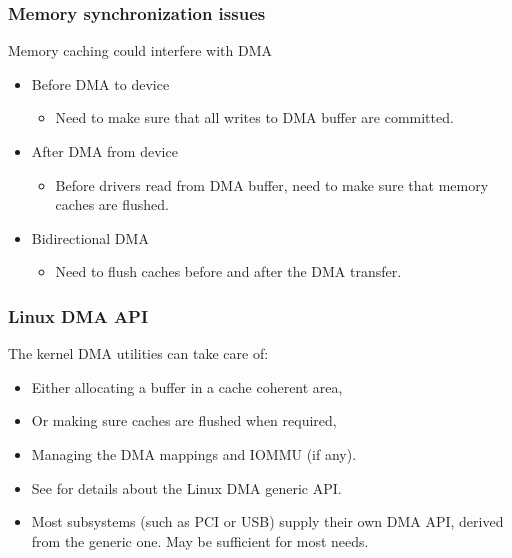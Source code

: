 \begin{frame}
  \frametitle{Memory synchronization issues}
  Memory caching could interfere with DMA
  \begin{itemize}
  \item Before DMA to device
    \begin{itemize}
    \item Need to make sure that all writes to DMA buffer are
      committed.
    \end{itemize}
  \item After DMA from device
    \begin{itemize}
    \item Before drivers read from DMA buffer, need to make sure
      that memory caches are flushed.
    \end{itemize}
  \item Bidirectional DMA
    \begin{itemize}
    \item Need to flush caches before and after the DMA transfer.
    \end{itemize}
  \end{itemize}
\end{frame}

\begin{frame}
  \frametitle{Linux DMA API}
  The kernel DMA utilities can take care of:
  \begin{itemize}
  \item Either allocating a buffer in a cache coherent area,
  \item Or making sure caches are flushed when required,
  \item Managing the DMA mappings and IOMMU (if any).
  \item See  for details about the
    Linux DMA generic API.
  \item Most subsystems (such as PCI or USB) supply their own DMA
    API, derived from the generic one. May be sufficient for most
    needs.
  \end{itemize}
\end{frame}

